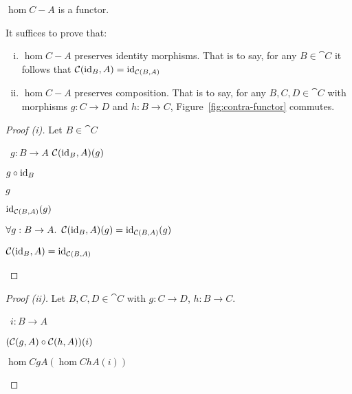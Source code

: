 \begin{prop}
  $\hom{C}{-}{A}$ is a functor.

  It suffices to prove that:
  \begin{enumerate}[(i)]
    \item $\hom{C}{-}{A}$ preserves identity morphisms. That is to say, for any $B\in\cat{C}$ it follows that $\mathcal{C}(\operatorname{id}_B, A) = \operatorname{id}_{\mathcal{C}(B, A)}$
    \item $\hom{C}{-}{A}$ preserves composition. That is to say, for any $B,C,D\in\cat{C}$ with morphisms $g : C \to D$
      and $h : B \to C$, Figure~\ref{fig:contra-functor} commutes.
  \end{enumerate}

  \begin{proof}[Proof (i)]
    Let $B\in\cat{C}$
    \begin{itemize}
      \step
        \begin{itemize}
          \subp{\star}
            \Let~$g : B \to A$
            \marginnote{\Hyp}
          \step
            $\mathcal{C}(\operatorname{id}_B, A)(g)$

          \step[=]
            $g\circ\operatorname{id}_B$
            \marginnote{\Def-\ref{def:contra-hom}}

          \step[=]
            $g$
            \marginnote{\Def-$\id$}

          \step[=]
            $\operatorname{id}_{\mathcal{C}(B, A)}(g)$
            \marginnote{\Def-$\id$}
        \end{itemize}

      \step[\imps]
        $\forall g : B \to A\ldotp~\mathcal{C}(\operatorname{id}_B, A)(g) = \operatorname{id}_{\mathcal{C}(B, A)}(g)$
        \marginnote{$\forall$-\Intro}

      \step[\iffs]
        $\mathcal{C}(\operatorname{id}_B, A) = \operatorname{id}_{\mathcal{C}(B, A)}$
        \marginnote{\Def-=}
        \qedhere
    \end{itemize}
  \end{proof}

  \begin{proof}[Proof (ii)]
    Let $B, C, D\in\cat{C}$ with ${g : C\to D}$, ${h : B\to C}$.
    \begin{itemize}
      \step
        \begin{itemize}
          \subp{\star} \Let~$i : B\to A$
            \marginnote{\Hyp}

          \step
            $(\mathcal{C}(g, A)\circ\mathcal{C}(h, A))(i)$

          \step[=] $\hom{C}{g}{A}(\hom{C}{h}{A}(i))$
            \marginnote{\Def-$\compose$}


\end{itemize}
\end{itemize}
\end{proof}
\end{prop}
